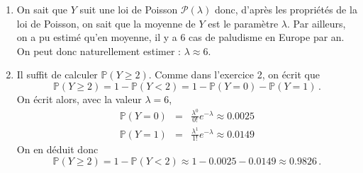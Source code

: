 \documentclass[a4paper,oneside,12pt]{article}
\theoremstyle{plain}
\def\P{{\mathbb P}}
\begin{document}
\begin{enumerate}
\item On sait que $Y$ suit une loi de Poisson $\mathcal{P}(\lambda)$ donc, d'après les propriétés 
de la loi de Poisson, on sait que  la moyenne de $Y$  est le paramètre $\lambda$. 
Par ailleurs, on a pu estimé qu'en moyenne, il y a 6 cas de paludisme en Europe par an. 
On peut donc naturellement estimer : $\lambda\approx 6$. 

\item Il suffit de calculer $\P(Y \geq 2)$. Comme dans l'exercice 2, on écrit que 
$$
\P(Y \geq 2) = 1- \P(Y <2) = 1 - \P(Y  = 0) -  \P(Y = 1)\,.
$$
On écrit alors, avec la valeur $\lambda=6$, 
\begin{eqnarray*}
\P(Y  = 0) & = & \frac{\lambda^0}{0!} e^{-\lambda} \approx 0.0025  \\
\P(Y  = 1) & = & \frac{\lambda^1}{1!} e^{-\lambda} \approx 0.0149  
\end{eqnarray*}
On en déduit donc 
$$
\P(Y \geq 2) = 1- \P(Y <2) \approx 1 - 0.0025 - 0.0149  \approx 0.9826  \,.
$$
\end{enumerate}
\end{document}
